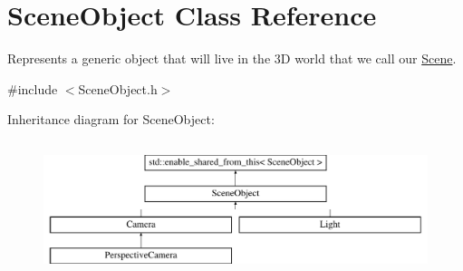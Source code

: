 \hypertarget{class_scene_object}{}\section{Scene\+Object Class Reference}
\label{class_scene_object}


Represents a generic object that will live in the 3\+D world that we call our \hyperlink{class_scene}{Scene}.  




{\ttfamily \#include $<$Scene\+Object.\+h$>$}

Inheritance diagram for Scene\+Object\+:\begin{figure}[H]
\begin{center}
\leavevmode
\includegraphics[height=3.985765cm]{class_scene_object}
\end{center}
\end{figure}
